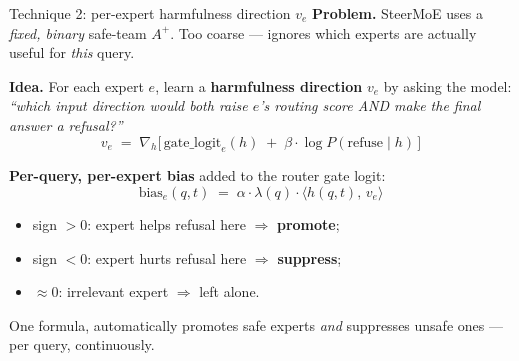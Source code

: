 \documentclass[aspectratio=169]{beamer}
\begin{document}
\begin{frame}{Technique 2: per-expert harmfulness direction \(v_e\)}
\vspace{-0.2em}
\small
  \textbf{Problem.} SteerMoE uses a \emph{fixed, binary} safe-team
  \(A^{+}\). Too coarse --- ignores which experts are actually useful
  for \emph{this} query.

  \vspace{0.6em}
  \textbf{Idea.} For each expert \(e\), learn a \textbf{harmfulness
  direction} \(v_e\) by asking the model:
  \emph{``which input direction would both raise \(e\)'s routing
  score AND make the final answer a refusal?''}
  \[
    v_e \;=\; \nabla_{h}\bigl[\,\mathrm{gate\_logit}_{e}(h) \;+\;
                               \beta\!\cdot\!\log P(\text{refuse}\mid h)\,\bigr]
  \]

  \vspace{-0.2em}
  \textbf{Per-query, per-expert bias} added to the router gate logit:
  \[
    \text{bias}_e(q,t) \;=\; \alpha\cdot\lambda(q)\cdot
    \langle h(q,t),\, v_e\rangle
  \]
  \vspace{-1.4em}
  \begin{itemize}\setlength\itemsep{0em}
    \item sign \(>0\): expert helps refusal here $\Rightarrow$ \textbf{promote};
    \item sign \(<0\): expert hurts refusal here $\Rightarrow$ \textbf{suppress};
    \item \(\approx 0\): irrelevant expert $\Rightarrow$ left alone.
  \end{itemize}
  One formula, automatically promotes safe experts \emph{and}
  suppresses unsafe ones --- per query, continuously.
\end{frame}
\end{document}

